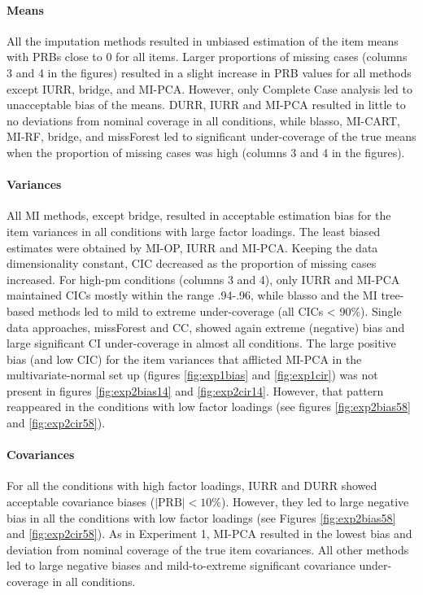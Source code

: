 	\paragraph{Means}
	All the imputation methods resulted in unbiased estimation of the item means with PRBs close to 0 
	for all items.
	Larger proportions of missing cases (columns 3 and 4 in the figures) resulted in a slight increase in PRB values 
	for all methods except IURR, bridge, and MI-PCA.
	However, only Complete Case analysis led to unacceptable bias of the means.
	DURR, IURR and MI-PCA resulted in little to no deviations from nominal coverage in all conditions, 
	while blasso, MI-CART, MI-RF, bridge, and missForest led to significant under-coverage of the true means when the 
	proportion of missing cases was high (columns 3 and 4 in the figures).
	
	\paragraph{Variances}
	All MI methods, except bridge, resulted in acceptable estimation bias for the item variances in all conditions
	with large factor loadings.
	The least biased estimates were obtained by MI-OP, IURR and MI-PCA.
	Keeping the data dimensionality constant, CIC decreased as the proportion of missing cases increased.
	For high-pm conditions (columns 3 and 4), only IURR and MI-PCA maintained CICs mostly within the range .94-.96, 
	while blasso and the MI tree-based methods led to mild to extreme under-coverage (all CICs < 90\%).
	Single data approaches, missForest and CC, showed again extreme (negative) bias and large significant CI 
	under-coverage in almost all conditions.
	The large positive bias (and low CIC) for the item variances that afflicted MI-PCA in the multivariate-normal set up 
	(figures \ref{fig:exp1bias} and \ref{fig:exp1cir}) was not present in figures \ref{fig:exp2bias14} and \ref{fig:exp2cir14}.
	However, that pattern reappeared in the conditions with low factor loadings (see figures \ref{fig:exp2bias58} 
	and \ref{fig:exp2cir58}).

	\paragraph{Covariances}
	For all the conditions with high factor loadings, IURR and DURR showed acceptable covariance biases 
	($|\text{PRB}|<10\%$).
	However, they led to large negative bias in all the conditions with low factor loadings (see Figures \ref{fig:exp2bias58} 
	and \ref{fig:exp2cir58}).
	As in Experiment 1, MI-PCA resulted in the lowest bias and deviation from nominal coverage of the true item covariances.
	All other methods led to large negative biases and mild-to-extreme significant covariance under-coverage in all conditions.


